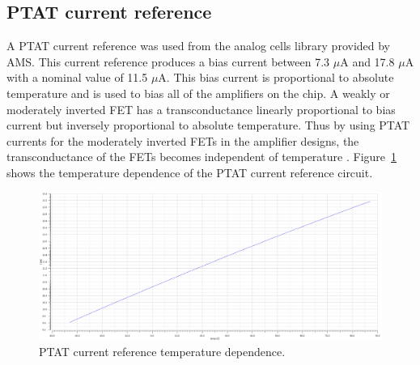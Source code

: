 \documentclass[12pt,oneside,final]{siuethesis}
\theoremstyle{definition}
\begin{document}
\subsection{PTAT current reference}
\par A PTAT current reference was used from the analog cells library provided by AMS. This current reference produces a bias current between 7.3 $\mu$A and 17.8 $\mu$A with a nominal value of 11.5 $\mu$A. This bias current is proportional to absolute temperature and is used to bias all of the amplifiers on the chip. A weakly or moderately inverted FET has a transconductance linearly proportional to bias current but inversely proportional to absolute temperature. Thus by using PTAT currents for the moderately inverted FETs in the amplifier designs, the transconductance of the FETs becomes independent of temperature \cite{ALLEN}. Figure~\ref{fig:ptat} shows the temperature dependence of the PTAT current reference circuit.

\begin{figure}[htbp!]
\centering
\includegraphics[scale=.3,keepaspectratio=true]{../data/ptat.png} 
\caption{PTAT current reference temperature dependence.}
\label{fig:ptat}
\end{figure}
\end{document}
